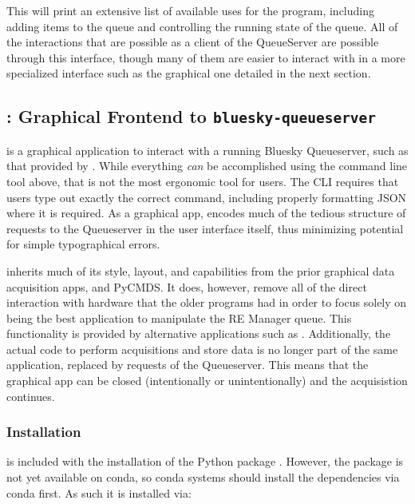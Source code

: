 
This will print an extensive list of available uses for the program, including adding items to the queue and controlling the running state of the queue.
All of the interactions that are possible as a client of the QueueServer are possible through this interface, though many of them are easier to interact with in a more specialized interface such as the graphical one detailed in the next section.

\subsection{\blueskycmds: Graphical Frontend to \texttt{bluesky-queueserver}}

\blueskycmds is a graphical application to interact with a running Bluesky Queueserver, such as that provided by \biab.
While everything \textit{can} be accomplished using the command line tool above, that is not the most ergonomic tool for users.
The CLI requires that users type out exactly the correct command, including properly formatting JSON where it is required.
As a graphical app, \blueskycmds encodes much of the tedious structure of requests to the Queueserver in the user interface itself, thus minimizing potential for simple typographical errors.

\blueskycmds inherits much of its style, layout, and capabilities from the prior graphical data acquisition apps, \yaqccmds and PyCMDS.
It does, however, remove all of the direct interaction with hardware that the older programs had in order to focus solely on being the best application to manipulate the RE Manager queue.
This functionality is provided by alternative applications such as \yaqcqtpy.
Additionally, the actual code to perform acquisitions and store data is no longer part of the same application, replaced by requests of the Queueserver.
This means that the graphical app can be closed (intentionally or unintentionally) and the acquisistion continues.

\subsubsection{Installation}

\blueskycmds is included with the installation of the Python package \blueskycmds.
However, the package is not yet available on conda, so conda systems should install the dependencies via conda first.
As such it is installed via:

